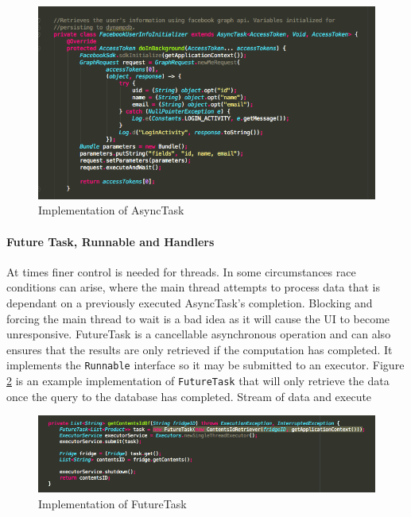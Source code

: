 \documentclass[a4paper, 11pt]{article}
\begin{document}
\begin{figure}[!htbp]
\centering
\includegraphics[width=\textwidth]{async}
\caption{Implementation of AsyncTask} \label{fig:async}
\end{figure}

\paragraph{Future Task, Runnable and Handlers } At times finer control is needed for threads. In some circumstances race conditions can arise, where the main thread attempts to process data that is dependant on a previously executed AsyncTask's completion. Blocking and forcing the main thread to wait is a bad idea as it will cause the UI to become unresponsive. FutureTask is a cancellable asynchronous operation and can also ensures that the results are only retrieved if the computation has completed. It implements the \texttt{Runnable} interface so it may be submitted to an executor. Figure \ref{fig:future} is an example implementation of \texttt{FutureTask} that will only retrieve the data once the query to the database has completed. Stream of data and execute


\begin{figure}[!htbp]
\centering
\includegraphics[width=\textwidth]{future}
\caption{Implementation of FutureTask} \label{fig:future}
\end{figure}


\end{document}

